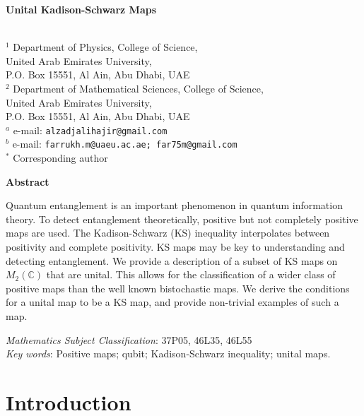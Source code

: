 \documentclass[11pt,reqno]{amsart}
\theoremstyle{definition}
\numberwithin{equation}{section} \setcounter{tocdepth}{1}
\numberwithin{equation}{section}
\begin{document}
\begin{center}
{\bf \LARGE {Unital Kadison-Schwarz Maps}}\\[0.5cm]

{\large {}}\\[0.5cm]
\end{center}
$^1$  Department of Physics, College of Science, \\
United Arab Emirates University,\\
 P.O. Box 15551, Al Ain,  Abu Dhabi, UAE\\[0.2cm]
$^2$  Department of Mathematical Sciences, College of Science, \\
United Arab Emirates University,\\
 P.O. Box 15551, Al Ain,  Abu Dhabi, UAE\\[0.4cm]
{\small $^a$ e-mail: {\tt alzadjalihajir@gmail.com}\\
$^b$ e-mail: {\tt farrukh.m@uaeu.ac.ae; far75m@gmail.com}\\
$^*$ Corresponding author}


\small
\begin{center}
{\bf Abstract}
\end{center}
Quantum entanglement is an important phenomenon in quantum information theory. To detect entanglement theoretically, positive but not completely positive maps are used. The Kadison-Schwarz (KS) inequality interpolates between positivity and complete positivity. KS maps may be key to understanding and detecting entanglement. We provide a description of a subset of KS maps on $M_2(\mathbb{C})$ that are unital. This allows for the classification of a wider class of positive maps than the well known bistochastic maps. We derive the conditions for a unital map to be a KS map, and provide non-trivial examples of such a map.

\vskip 0.3cm \noindent
{\it Mathematics Subject Classification}: 37P05, 46L35, 46L55\\
{\it Key words}: Positive maps; qubit; Kadison-Schwarz inequality; unital maps.

\normalsize

\section{Introduction}
\end{document}
